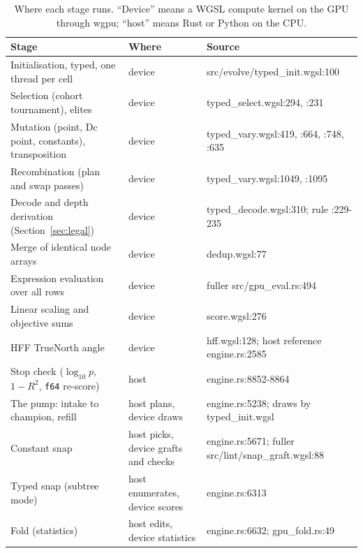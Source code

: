 \documentclass[sigconf,nonacm]{acmart}
\newcommand{\src}[1]{{\small\ttfamily #1}}
\begin{document}
\begin{table}[t]
\caption{Where each stage runs. ``Device'' means a WGSL compute kernel on the
GPU through wgpu; ``host'' means Rust or Python on the CPU.}
\label{tab:where}
\small
\begin{tabular}{@{}llp{}@{}}
\toprule
Stage & Where & Source \\
\midrule
Initialisation, typed, one thread per cell & device & \src{src/\allowbreak{}evolve/\allowbreak{}typed\_\allowbreak{}init.\allowbreak{}wgsl:100} \\
Selection (cohort tournament), elites & device & \src{typed\_\allowbreak{}select.\allowbreak{}wgsl:294}, \src{:231} \\
Mutation (point, Dc point, constants), transposition & device & \src{typed\_\allowbreak{}vary.\allowbreak{}wgsl:419}, \src{:664}, \src{:748}, \src{:635} \\
Recombination (plan and swap passes) & device & \src{typed\_\allowbreak{}vary.\allowbreak{}wgsl:1049}, \src{:1095} \\
Decode and depth derivation (Section~\ref{sec:legal}) & device & \src{typed\_\allowbreak{}decode.\allowbreak{}wgsl:310}; rule \src{:229-235} \\
Merge of identical node arrays & device & \src{dedup.\allowbreak{}wgsl:77} \\
Expression evaluation over all rows & device & fuller \src{src/\allowbreak{}gpu\_\allowbreak{}eval.\allowbreak{}rs:494} \\
Linear scaling and objective sums & device & \src{score.\allowbreak{}wgsl:276} \\
HFF TrueNorth angle & device & \src{hff.\allowbreak{}wgsl:128}; host reference \src{engine.\allowbreak{}rs:2585} \\
Stop check ($\log_{10}p$, $1-R^2$, \texttt{f64} re-score) & host & \src{engine.\allowbreak{}rs:8852-8864} \\
The pump: intake to champion, refill & host plans, device draws & \src{engine.\allowbreak{}rs:5238}; draws by \src{typed\_\allowbreak{}init.\allowbreak{}wgsl} \\
Constant snap & host picks, device grafts and checks & \src{engine.\allowbreak{}rs:5671}; fuller \src{src/\allowbreak{}lint/\allowbreak{}snap\_\allowbreak{}graft.\allowbreak{}wgsl:88} \\
Typed snap (subtree mode) & host enumerates, device scores & \src{engine.\allowbreak{}rs:6313} \\
Fold (statistics) & host edits, device statistics & \src{engine.\allowbreak{}rs:6632}; \src{gpu\_\allowbreak{}fold.\allowbreak{}rs:49} \\

\end{tabular}
\end{table}
\end{document}
